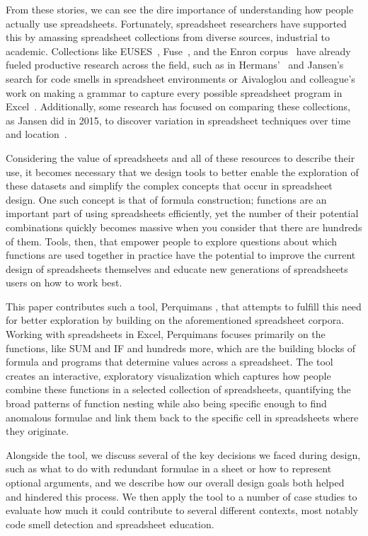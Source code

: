 \documentclass[conference]{IEEEtran}
\newcommand{\toolname}{Perquimans }
\begin{document}
	From these stories, we can see the dire importance of understanding how people
	actually use spreadsheets. Fortunately, spreadsheet
	researchers have supported this by amassing spreadsheet collections from
	diverse sources, industrial to academic. Collections like EUSES~\cite{fisher2005euses}, 
	Fuse~\cite{barik2015fuse}, and the Enron corpus~\cite{hermans2015enron} have already fueled productive research across the
	field, such as in Hermans'~\cite{hermans2012detecting} and Jansen's~\cite{jansen2015code} search for code smells in spreadsheet environments or
	Aivaloglou and colleague's work on making a grammar to capture every possible
	spreadsheet program in Excel~\cite{aivaloglou2015grammar}. Additionally, some
	research has focused on comparing these collections, as Jansen did in
	2015, to discover variation in spreadsheet techniques over time and location~\cite{jansen2015enron}.
	
	Considering the value of spreadsheets and all of these resources to
	describe their use, it becomes necessary that we design tools to better enable the
	exploration of these datasets and simplify the complex concepts that occur in
	spreadsheet design. One such concept is that of formula construction; functions
	are an important part of using spreadsheets efficiently, yet the number of their potential
	combinations quickly becomes massive when you consider that there are hundreds of them.
	Tools, then, that empower people to explore questions about which functions are used together 
	in practice have the potential to improve the current design of spreadsheets themselves and educate
	new generations of spreadsheets users on how to work best.
	
	This paper contributes such a tool, \toolname, that attempts to fulfill this
	need for better exploration by
	building on the aforementioned spreadsheet corpora. Working with spreadsheets
	in Excel, \toolname focuses primarily on the functions, like SUM and IF and
	hundreds more, which are the building blocks of formula and programs that
	determine values across a spreadsheet. The tool creates an interactive,
	exploratory visualization which captures how people combine these functions in
	a selected collection of spreadsheets, quantifying the broad patterns of
	function nesting while also being specific enough to find anomalous formulae
	and link them back to the specific cell in spreadsheets where they originate.
	\par
	
	Alongside the tool, we discuss several of the key decisions we faced during
	design, such as what to do with redundant formulae in a sheet or how to
	represent optional arguments, and we describe how our overall design goals both
	helped and hindered this process. We then apply the tool to a number of case
	studies to evaluate how much it could contribute to several different contexts,
	most notably code smell detection and spreadsheet education.
	
\end{document}
